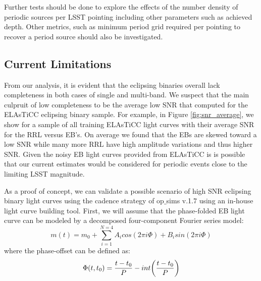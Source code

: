 \documentclass[DM,authoryear,toc]{lsstdoc}
\begin{document}
Further tests should be done to explore the effects of the number density of periodic sources per LSST pointing including other parameters such as achieved depth. Other metrics, such as minimum period grid required per pointing to recover a period source should also be investigated.


\subsection{Current Limitations}\label{sec:limitations}

From our analysis, it is evident that the eclipsing binaries overall lack completeness in both cases of single and multi-band.
We suspect that the main culpruit of low completeness to be the average low SNR that computed for the ELAsTiCC eclipsing binary sample.
For example, in Figure \ref{fig:snr_average}, we show for a sample of all training ELAsTiCC light curves with their average SNR for the RRL versus EB's.
On average we found that the EBs are skewed toward a low SNR while many more RRL have high amplitude variations and thus higher SNR.
Given the noisy EB light curves provided from ELAsTiCC is is possible that our current estimates would be considered for periodic events close to the limiting LSST magnitude.

As a proof of concept, we can validate a possible scenario of high SNR eclipsing binary light curves using the cadence strategy of op$\_$sims v.1.7 using an in-house light curve building tool.
First, we will assume that the phase-folded EB light curve can be modeled by a decomposed four-component Fourier series model:
\begin{equation}
m(t) = m_0 + \sum_{i=1}^{N=4} A_icos(2\pi i\Phi) + B_isin(2\pi i \Phi)
\end{equation}
where the phase-offset can be defined as:
\begin{equation}
\Phi(t,t_{0}) = \frac{t-t_{0}}{P}-int\bigg{(}\frac{t-t_{0}}{P} \bigg{)}
\end{equation}
\end{document}
